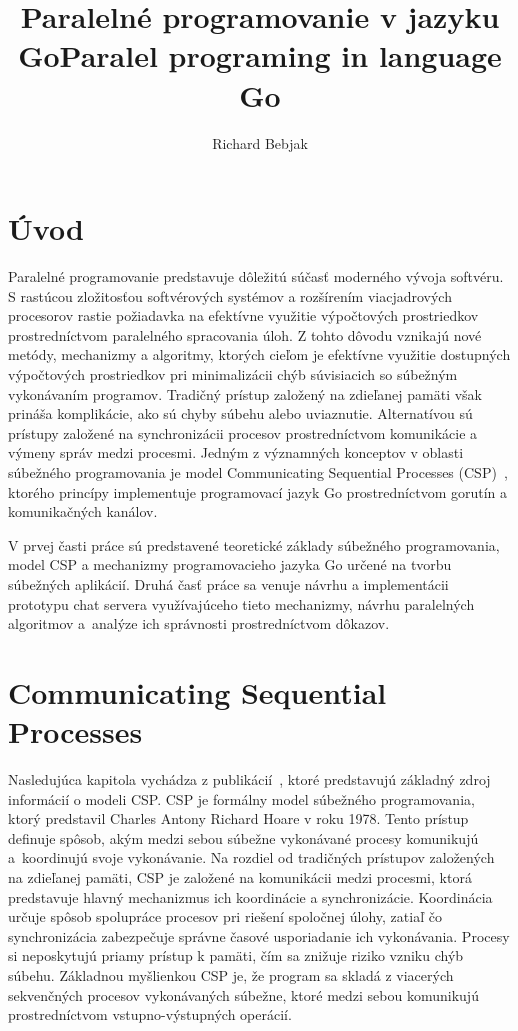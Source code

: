 \documentclass[
  biblatex,
  seconds=true,
  language=slovak,
  figures=false,
  urldate=iso,
  glossaries,
  index
]{kidiplom}
\title{Paralelné programovanie v jazyku Go}
\title[english]{Paralel programing in language Go}
\author{Richard Bebjak}
\begin{document}
\maketitle
\listoffigures
\newpage
\lstlistoflistings
\newcommand{\BibLaTeX}{\textsc{Bib}\LaTeX}
\renewcommand{\lstlistingname}{Ukážkový kód}

\newpage
\section{Úvod}
Paralelné programovanie predstavuje dôležitú súčasť moderného vývoja softvéru. S rastúcou zložitosťou softvérových systémov a rozšírením viacjadrových procesorov rastie požiadavka na efektívne využitie výpočtových prostriedkov prostredníctvom paralelného spracovania úloh. Z tohto dôvodu vznikajú nové metódy, mechanizmy a algoritmy, ktorých cieľom je efektívne využitie dostupných výpočtových prostriedkov pri minimalizácii chýb súvisiacich so súbežným vykonávaním programov. Tradičný prístup založený na zdieľanej pamäti však prináša komplikácie, ako sú chyby súbehu alebo uviaznutie. Alternatívou sú prístupy založené na synchronizácii procesov prostredníctvom komunikácie a výmeny správ medzi procesmi. Jedným z významných konceptov v oblasti súbežného programovania je model Communicating Sequential Processes (CSP)~\cite{hoare1978s}, ktorého princípy implementuje programovací jazyk Go prostredníctvom gorutín a komunikačných kanálov.

V prvej časti práce sú predstavené teoretické základy súbežného programovania, model CSP a mechanizmy programovacieho jazyka Go určené na tvorbu súbežných aplikácií. Druhá časť práce sa venuje návrhu a implementácii prototypu chat servera využívajúceho tieto mechanizmy, návrhu paralelných algoritmov a~analýze ich správnosti prostredníctvom dôkazov.

\newpage
\section{Communicating Sequential Processes}
Nasledujúca kapitola vychádza z publikácií~\cite{hoare1978,hoare1978s}, ktoré predstavujú základný zdroj informácií o modeli CSP.
CSP je formálny model súbežného programovania, ktorý predstavil Charles Antony Richard Hoare v roku 1978.
Tento prístup definuje spôsob, akým medzi sebou súbežne vykonávané procesy komunikujú a~koordinujú svoje vykonávanie. Na rozdiel od tradičných prístupov založených
na zdieľanej pamäti, CSP je založené na komunikácii medzi procesmi, ktorá predstavuje hlavný mechanizmus ich koordinácie a synchronizácie. Koordinácia určuje spôsob spolupráce procesov pri riešení spoločnej úlohy, zatiaľ čo synchronizácia zabezpečuje správne časové usporiadanie ich vykonávania. 
Procesy si neposkytujú priamy
prístup k pamäti, čím sa znižuje riziko vzniku chýb súbehu. Základnou myšlienkou CSP je, že program sa skladá z viacerých sekvenčných procesov
vykonávaných súbežne, ktoré medzi sebou komunikujú prostredníctvom vstupno-výstupných operácií.
\end{document}

